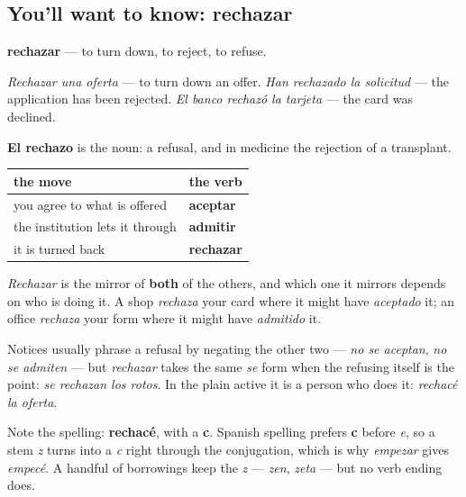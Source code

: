 \subsection*{You'll want to know: rechazar}
\textbf{rechazar} — to turn down, to reject, to refuse.

\emph{Rechazar una oferta} — to turn down an offer. \emph{Han rechazado la solicitud} — the application has been rejected. \emph{El banco rechazó la tarjeta} — the card was declined.

\textbf{El rechazo} is the noun: a refusal, and in medicine the rejection of a transplant.

\begin{grammarlens}[title={Grammar Lens: the three verbs of the counter, completed}]
\noindent
\begin{tabularx}{\linewidth}{@{}>{\raggedright\arraybackslash}X>{\raggedright\arraybackslash}X@{}}
\toprule
\textbf{the move} & \textbf{the verb} \\
\midrule
you agree to what is offered & \textbf{aceptar} \\
the institution lets it through & \textbf{admitir} \\
it is turned back & \textbf{rechazar} \\
\bottomrule
\end{tabularx}

\emph{Rechazar} is the mirror of \textbf{both} of the others, and which one it mirrors depends on who is doing it. A shop \emph{rechaza} your card where it might have \emph{aceptado} it; an office \emph{rechaza} your form where it might have \emph{admitido} it.

Notices usually phrase a refusal by negating the other two — \emph{no se aceptan}, \emph{no se admiten} — but \emph{rechazar} takes the same \emph{se} form when the refusing itself is the point: \emph{se rechazan los rotos}. In the plain active it is a person who does it: \emph{rechacé la oferta}.

Note the spelling: \textbf{rechacé}, with a \textbf{c}. Spanish spelling prefers \textbf{c} before \emph{e}, so a stem \emph{z} turns into a \emph{c} right through the conjugation, which is why \emph{empezar} gives \emph{empecé}. A handful of borrowings keep the \emph{z} — \emph{zen}, \emph{zeta} — but no verb ending does.
\end{grammarlens}

